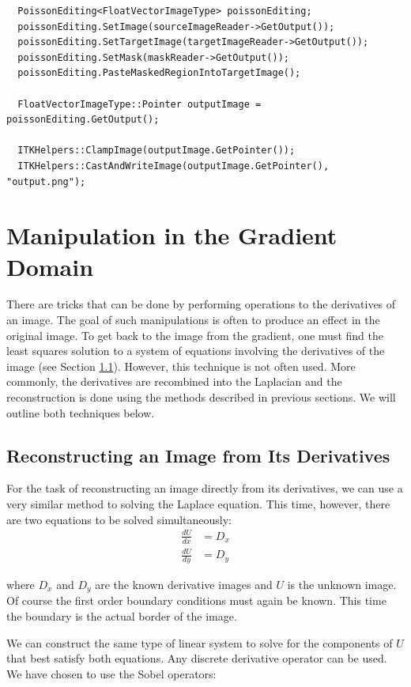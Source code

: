 \documentclass{InsightArticle}
\begin{document}
\begin{verbatim}
  PoissonEditing<FloatVectorImageType> poissonEditing;
  poissonEditing.SetImage(sourceImageReader->GetOutput());
  poissonEditing.SetTargetImage(targetImageReader->GetOutput());
  poissonEditing.SetMask(maskReader->GetOutput());
  poissonEditing.PasteMaskedRegionIntoTargetImage();

  FloatVectorImageType::Pointer outputImage = poissonEditing.GetOutput();

  ITKHelpers::ClampImage(outputImage.GetPointer());
  ITKHelpers::CastAndWriteImage(outputImage.GetPointer(), "output.png");
\end{verbatim}

\section{Manipulation in the Gradient Domain}
There are tricks that can be done by performing operations to the derivatives of an image. The goal of such manipulations is often to produce an effect in the original image. To get back to the image from the gradient, one must find the least squares solution to a system of equations involving the derivatives of the image (see Section \ref{sec:ReconstructingFromDerivatives}). However, this technique is not often used. More commonly, the derivatives are recombined into the Laplacian and the reconstruction is done using the methods described in previous sections. We will outline both techniques below.

\subsection{Reconstructing an Image from Its Derivatives}
\label{sec:ReconstructingFromDerivatives}
For the task of reconstructing an image directly from its derivatives, we can use a very similar method to solving the Laplace equation. This time, however, there are two equations to be solved simultaneously:
\begin{align}
\frac{dU}{dx} &= D_x \\
\frac{dU}{dy} &= D_y
\end{align}

where $D_x$ and $D_y$ are the known derivative images and $U$ is the unknown image. Of course the first order boundary conditions must again be known. This time the boundary is the actual border of the image.

We can construct the same type of linear system to solve for the components of $U$ that best satisfy both equations. Any discrete derivative operator can be used. We have chosen to use the Sobel operators:
\end{document}
